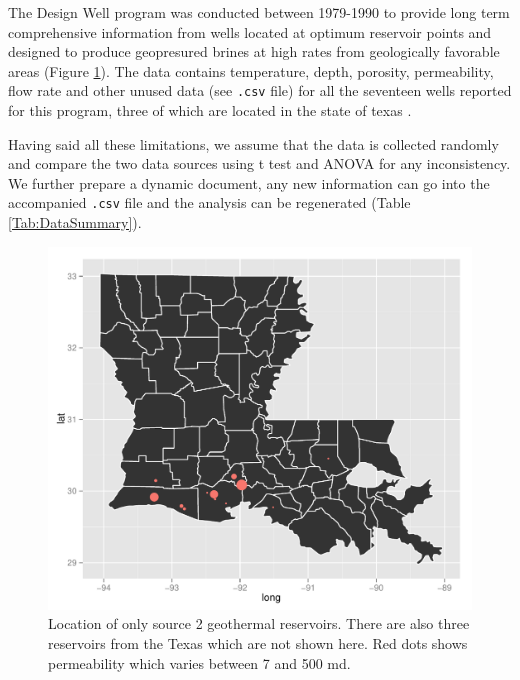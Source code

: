 \documentclass[review,authoryear, 12pt]{elsarticle}\usepackage[]{graphicx}\usepackage[]{color}
\makeatletter
\def\maxwidth{ %
  \ifdim\Gin@nat@width>\linewidth
    \linewidth
  \else
    \Gin@nat@width
  \fi
}
\newenvironment{knitrout}{}{} %
\makeatother
\begin{document}
The Design Well program was conducted between 1979-1990 to provide long term  comprehensive information from wells located at optimum reservoir points and designed to produce geopresured brines at high rates from geologically favorable areas (Figure \ref{Fig:map_perm}). The data contains temperature, depth, porosity, permeability, flow rate and other unused data (see \texttt{.csv} file) for all the seventeen wells reported for this program, three of which are located in the state of texas \citep{john1998gulf}.

Having said all these limitations, we assume that the data is collected randomly and compare the two data sources using t test and ANOVA for any inconsistency. We further prepare a dynamic document, any new information can go into the accompanied \texttt{.csv} file and the analysis can be regenerated (Table \ref{Tab:DataSummary}). 


\begin{knitrout}
\color{fgcolor}\begin{figure}[]

\includegraphics[width=\maxwidth]{figure/map_perm} \caption[Location of only source 2 geothermal reservoirs]{Location of only source 2 geothermal reservoirs. There are also three reservoirs from the Texas which are not shown here. Red dots shows permeability which varies between 7 and 500 md.\label{Fig:map_perm}}
\end{figure}


\end{knitrout}
\end{document}
